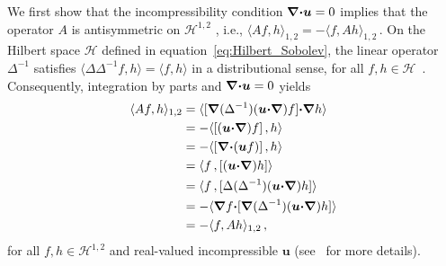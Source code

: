 \documentclass[english,12pt,jmp,graphicx]{revtex4-1}
\newcommand{\vecu}{\boldsymbol{u}}
\newcommand{\bnabla}{\mbox{\boldmath${\nabla}$}}
\newcommand{\bcdot}{\mbox{\boldmath${\cdot}$}}
\newcommand{\Hs}{\mathscr{H}}
\begin{document}
We first show that the incompressibility condition
$\bnabla\bcdot\vecu=0$ implies that the operator $A$ is
antisymmetric on $\Hs^{1,2}$ \cite{Bhattacharya:AAP:1999:951,Bhattacharya:1989:ASD}, i.e.,
$\langle Af,h\rangle_{1,2}=-\langle f,A h\rangle_{1,2}\,.$ On the 
Hilbert space $\Hs$ defined in equation~\eqref{eq:Hilbert_Sobolev}, the linear
operator $\Delta^{-1}$ satisfies $\langle\Delta\Delta^{-1}f,h\rangle=\langle f,h\rangle$ in a distributional
sense, for all
$f,h\in\Hs$~\cite{McOwen:2003:PDE,Folland:95:PDEs,Murphy:ADSTPF-2017}.
Consequently, integration by parts and $\bnabla\bcdot\vecu=0$
yields~\cite{Bhattacharya:AAP:1999:951,Bhattacharya:1989:ASD,Murphy:ADSTPF-2017,Pavliotis:PHD_Thesis} 
%
\begin{align}\label{eq:Anti-sym_Sobolev}
 \langle Af,h\rangle_{1,2}%
       &=\langle[\bnabla(\Delta^{-1})(\vecu\bcdot\bnabla)f]\bcdot\bnabla h\rangle
       \\                              
       &=-\langle[(\vecu\bcdot\bnabla)f]\,,h\rangle
       \notag\\
       &=-\langle[\bnabla\bcdot(\vecu f)]\,,h\rangle
       \notag\\     
       &=\langle f\,,[(\vecu\bcdot\bnabla)h]\rangle
       \notag\\
       &=\langle f\,,[\Delta(\Delta^{-1})(\vecu\bcdot\bnabla)h]\rangle
       \notag\\
       &=-\langle\bnabla f\bcdot[\bnabla(\Delta^{-1})(\vecu\bcdot\bnabla)h]\rangle
       \notag\\                              
       &=-\langle f,Ah\rangle_{1,2}\,,
       \notag
\end{align}
%
for all $f,h\in\Hs^{1,2}$ and real-valued incompressible $\vecu$
(see~\cite{Murphy:ADSTPF-2017} for more details).
\end{document}

